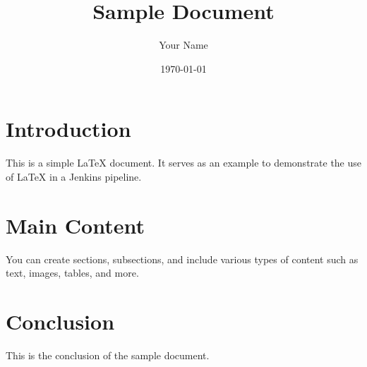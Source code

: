 \documentclass{article}
\title{Sample Document}
\author{Your Name}
\date{\today}
\begin{document}
\maketitle

\section{Introduction}

This is a simple LaTeX document. It serves as an example to demonstrate the use of LaTeX in a Jenkins pipeline.

\section{Main Content}

You can create sections, subsections, and include various types of content such as text, images, tables, and more.

\section{Conclusion}

This is the conclusion of the sample document.
\end{document}
